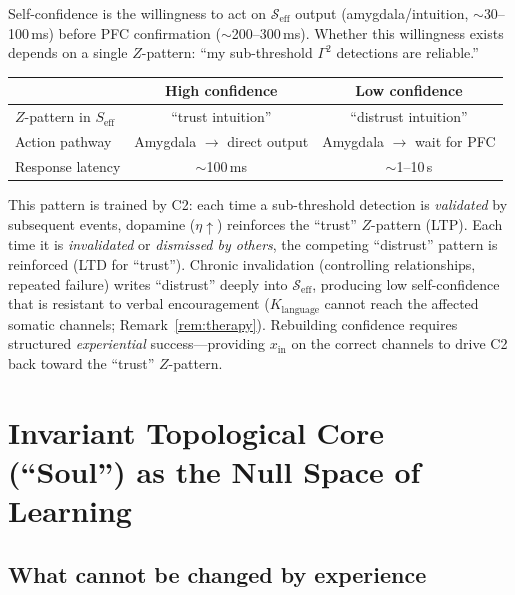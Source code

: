 \documentclass[aps,pre,twocolumn,superscriptaddress,floatfix]{revtex4-2}
\begin{document}
\begin{remark}
\label{rem:confidence}
Self-confidence is the willingness to act on
$\mathcal{S}_{\text{eff}}$ output (amygdala/intuition,
$\sim$30--100\,ms) before PFC confirmation
($\sim$200--300\,ms).
Whether this willingness exists depends on a
single $Z$-pattern:
``my sub-threshold $\Gamma^2$ detections are reliable.''

\begin{center}
\begin{tabular}{lcc}
\toprule
& High confidence & Low confidence \\
\midrule
$Z$-pattern in $S_{\text{eff}}$ &
  ``trust intuition'' & ``distrust intuition'' \\
Action pathway &
  Amygdala $\to$ direct output &
  Amygdala $\to$ wait for PFC \\
Response latency & $\sim$100\,ms & $\sim$1--10\,s \\
\bottomrule
\end{tabular}
\end{center}

This pattern is trained by C2:
each time a sub-threshold detection is \emph{validated}
by subsequent events, dopamine ($\eta \uparrow$)
reinforces the ``trust'' $Z$-pattern (LTP).
Each time it is \emph{invalidated} or \emph{dismissed
by others}, the competing ``distrust'' pattern is
reinforced (LTD for ``trust'').
Chronic invalidation (controlling relationships,
repeated failure) writes ``distrust'' deeply into
$\mathcal{S}_{\text{eff}}$, producing low
self-confidence that is resistant to verbal
encouragement ($K_{\text{language}}$ cannot reach the
affected somatic channels;
Remark~\ref{rem:therapy}).
Rebuilding confidence requires structured
\emph{experiential} success---providing
$x_{\text{in}}$ on the correct channels to drive
C2 back toward the ``trust'' $Z$-pattern.
\end{remark}


\section{Invariant Topological Core (``Soul'') as the Null Space of Learning}
\label{sec:soul}

\subsection{What cannot be changed by experience}
\end{document}
